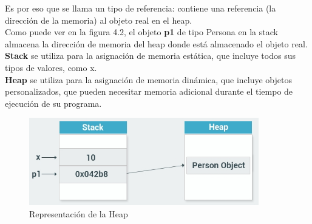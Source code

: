 \documentclass[12pt,a4paper]{report}
\begin{document}
Es por eso que se llama un tipo de referencia: contiene una referencia (la dirección de la memoria) al objeto real en el heap.\\Como puede ver en la figura 4.2, el objeto \textbf{p1} de tipo Persona en la stack almacena la dirección de memoria del heap donde está almacenado el objeto real.\\\textbf{Stack} se utiliza para la asignación de memoria estática, que incluye todos sus tipos de valores, como x.\\\textbf{Heap} se utiliza para la asignación de memoria dinámica, que incluye objetos personalizados, que pueden necesitar memoria adicional durante el tiempo de ejecución de su programa.\begin{figure}[hbtp]
\centering
\includegraphics[width=10cm]{Csh_Imagenes/heap.jpg}
\caption{Representación de la Heap}
\end{figure}
\end{document}
